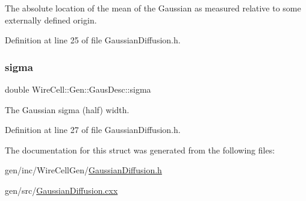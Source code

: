 The absolute location of the mean of the Gaussian as measured relative to some externally defined origin. 

Definition at line 25 of file Gaussian\+Diffusion.\+h.

\mbox{\label{struct_wire_cell_1_1_gen_1_1_gaus_desc_aa9d4b50ba1852c92f5e9b8bb7d63c2bd}} 
\subsubsection{\texorpdfstring{sigma}{sigma}}
{\footnotesize\ttfamily double Wire\+Cell\+::\+Gen\+::\+Gaus\+Desc\+::sigma}



The Gaussian sigma (half) width. 



Definition at line 27 of file Gaussian\+Diffusion.\+h.



The documentation for this struct was generated from the following files\+:\begin{DoxyCompactItemize}
\item 
gen/inc/\+Wire\+Cell\+Gen/\hyperlink{_gaussian_diffusion_8h}{Gaussian\+Diffusion.\+h}\item 
gen/src/\hyperlink{_gaussian_diffusion_8cxx}{Gaussian\+Diffusion.\+cxx}\end{DoxyCompactItemize}
